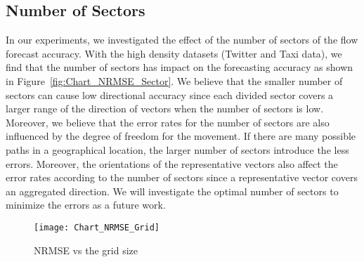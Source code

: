 
\subsection{Number of Sectors}
In our experiments, we investigated the effect of the number of sectors of the flow forecast accuracy. 
With the high density datasets (Twitter and Taxi data), we find that the number of sectors has impact on the forecasting accuracy as shown in Figure~\ref{fig:Chart_NRMSE_Sector}.
We believe that the smaller number of sectors can cause low directional accuracy
since each divided sector covers a larger range of the direction of vectors when the number of sectors is low. Moreover, we believe that the error rates for the number of sectors are also influenced by the degree of freedom for the movement. If there are many possible paths in a geographical location, the larger number of sectors introduce the less errors. Moreover, the orientations of the representative vectors also affect the error rates according to the number of sectors since a representative vector covers an aggregated direction. We will investigate the optimal number of sectors to minimize the errors as a future work. 



\begin{figure}[t]
	\centering
	\texttt{[image: Chart\_NRMSE\_Grid]}
	\caption{NRMSE vs the grid size}
	\label{fig:Chart_NRMSE_Grid}
\end{figure}

